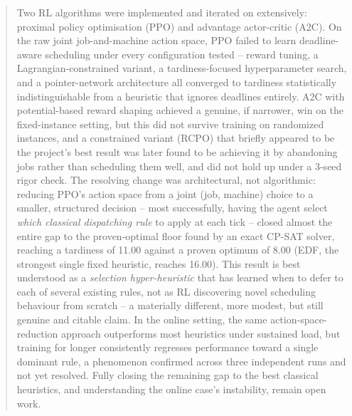 \documentclass[12pt]{article}
\begin{document}
\begin{abstract}
Two RL algorithms were implemented and iterated on extensively: proximal policy optimisation (PPO) and advantage actor-critic (A2C). On the raw joint job-and-machine action space, PPO failed to learn deadline-aware scheduling under every configuration tested -- reward tuning, a Lagrangian-constrained variant, a tardiness-focused hyperparameter search, and a pointer-network architecture all converged to tardiness statistically indistinguishable from a heuristic that ignores deadlines entirely. A2C with potential-based reward shaping \cite{ng1999shaping} achieved a genuine, if narrower, win on the fixed-instance setting, but this did not survive training on randomized instances, and a constrained variant (RCPO) that briefly appeared to be the project's best result was later found to be achieving it by abandoning jobs rather than scheduling them well, and did not hold up under a 3-seed rigor check. The resolving change was architectural, not algorithmic: reducing PPO's action space from a joint (job, machine) choice to a smaller, structured decision -- most successfully, having the agent select \emph{which classical dispatching rule} to apply at each tick -- closed almost the entire gap to the proven-optimal floor found by an exact CP-SAT solver, reaching a tardiness of 11.00 against a proven optimum of 8.00 (EDF, the strongest single fixed heuristic, reaches 16.00). This result is best understood as a \emph{selection hyper-heuristic} that has learned when to defer to each of several existing rules, not as RL discovering novel scheduling behaviour from scratch -- a materially different, more modest, but still genuine and citable claim. In the online setting, the same action-space-reduction approach outperforms most heuristics under sustained load, but training for longer consistently regresses performance toward a single dominant rule, a phenomenon confirmed across three independent runs and not yet resolved. Fully closing the remaining gap to the best classical heuristics, and understanding the online case's instability, remain open work.

\end{abstract}


\newpage
\end{document}

